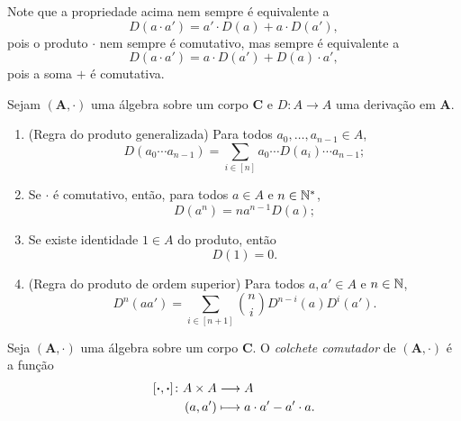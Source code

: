 Note que a propriedade acima nem sempre é equivalente a
	\begin{equation*}
	D(a \cdot a') = a' \cdot D(a)  + a \cdot D(a'),
	\end{equation*}
pois o produto $\cdot$ nem sempre é comutativo, mas sempre é equivalente a
	\begin{equation*}
	D(a \cdot a') = a \cdot D(a') + D(a) \cdot a',
	\end{equation*}
pois a soma $+$ é comutativa.

\begin{proposition}
Sejam $(\bm A,\cdot)$ uma álgebra sobre um corpo $\bm C$ e $D\colon A \to A$ uma derivação em $\bm A$.
	\begin{enumerate}
	\item (Regra do produto generalizada) Para todos $a_0,\ldots,a_{n-1} \in A$,
		\begin{equation*}
		D(a_0 \cdots a_{n-1}) = \sum_{i \in [n]} a_0 \cdots D(a_i) \cdots a_{n-1};
		\end{equation*}
	\item Se $\cdot$ é comutativo, então, para todos $a \in A$ e $n \in \mathbb{N}^*$,
		\begin{equation*}
		D(a^n) = na^{n-1}D(a);
		\end{equation*}
	\item Se existe identidade $1 \in A$ do produto, então
		\begin{equation*}
		D(1)=0.
		\end{equation*}
	\item (Regra do produto de ordem superior) Para todos $a,a' \in A$ e $n \in \mathbb{N}$,
		\begin{equation*}
		D^n(aa') = \sum_{i \in [n+1]} \binom{n}{i} D^{n-i}(a)D^i(a').
		\end{equation*}
	\end{enumerate}
\end{proposition}

\begin{definition}
Seja $(\bm A,\cdot)$ uma álgebra sobre um corpo $\bm C$. O \emph{colchete comutador} de $(\bm A,\cdot)$ é a função
	\begin{align*}
	{\left[{\bm{\cdot}},{\bm{\cdot}}\right]}\colon {A \times A} &\longrightarrow {A} \\{(a,a')} &\longmapsto a \cdot a' - a' \cdot a.
	\end{align*}
\end{definition}

